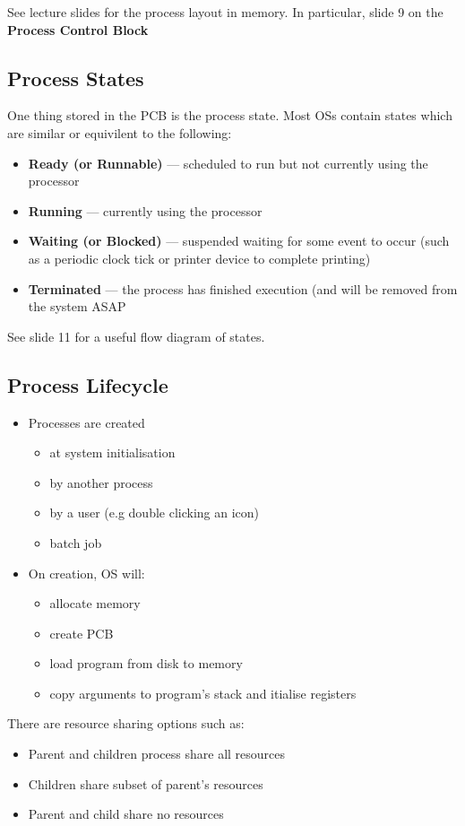 \documentclass{article}%
\begin{document}
See lecture slides for the process layout in memory.
In particular, slide 9 on the \textbf{Process Control Block}

\subsection{Process States}
One thing stored in the PCB is the process state.
Most OSs contain states which are similar or equivilent to the following:
\begin{itemize}
	\item \textbf{Ready (or Runnable)} --- scheduled to run but not currently using the processor
	\item \textbf{Running} --- currently using the processor
	\item \textbf{Waiting (or Blocked)} --- suspended waiting for some event to occur (such as a periodic clock tick or printer device to complete printing)
	\item \textbf{Terminated} --- the process has finished execution (and will be removed from the system ASAP
\end{itemize}

See slide 11 for a useful flow diagram of states.

\subsection{Process Lifecycle}
\begin{itemize}
	\item Processes are created
		\begin{itemize}
			\item at system initialisation
			\item by another process
			\item by a user (e.g double clicking an icon)
			\item batch job
		\end{itemize}
	\item On creation, OS will:
		\begin{itemize}
			\item allocate memory
			\item create PCB
			\item load program from disk to memory
			\item copy arguments to program's stack and itialise registers
		\end{itemize}
\end{itemize}

There are resource sharing options such as:
\begin{itemize}
	\item Parent and children process share all resources
	\item Children share subset of parent's resources
	\item Parent and child share no resources
\end{itemize}
\end{document}
